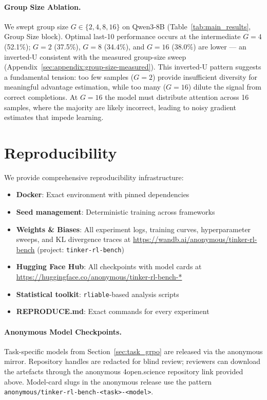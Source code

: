 \documentclass{article}
\begin{document}
\paragraph{Group Size Ablation.}
We swept group size $G \in \{2, 4, 8, 16\}$ on Qwen3-8B
(Table~\ref{tab:main_results}, Group Size block).
Optimal last-10 performance occurs at the intermediate $G{=}4$ (52.1\%);
$G{=}2$ (37.5\%), $G{=}8$ (34.4\%), and $G{=}16$ (38.0\%) are lower --- an
inverted-U consistent with the measured group-size sweep
(Appendix~\ref{sec:appendix:group-size-measured}).
This inverted-U pattern suggests a fundamental tension: too few samples
($G{=}2$) provide insufficient diversity for meaningful advantage estimation,
while too many ($G{=}16$) dilute the signal from correct completions.
At $G{=}16$ the model must distribute attention across 16 samples, where the
majority are likely incorrect, leading to noisy gradient estimates that impede
learning.

\section{Reproducibility}
\label{sec:reproducibility}

We provide comprehensive reproducibility infrastructure:
\begin{itemize}
    \item \textbf{Docker}: Exact environment with pinned dependencies
    \item \textbf{Seed management}: Deterministic training across frameworks
    \item \textbf{Weights \& Biases}: All experiment logs, training curves,
    hyperparameter sweeps, and KL divergence traces at
    \url{https://wandb.ai/anonymous/tinker-rl-bench}
    (project: \texttt{tinker-rl-bench})
    \item \textbf{Hugging Face Hub}: All checkpoints with model cards at
    \url{https://huggingface.co/anonymous/tinker-rl-bench-*}
    \item \textbf{Statistical toolkit}: \texttt{rliable}-based analysis scripts
    \item \textbf{REPRODUCE.md}: Exact commands for every experiment
\end{itemize}

\paragraph{Anonymous Model Checkpoints.}
Task-specific models from Section~\ref{sec:task_grpo} are released via the
anonymous mirror. Repository handles are redacted for blind review; reviewers
can download the artefacts through the anonymous 4open.science repository
link provided above. Model-card slugs in the anonymous release use the
pattern \texttt{anonymous/tinker-rl-bench-<task>-<model>}.
\end{document}
